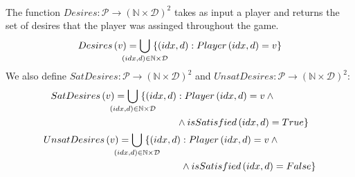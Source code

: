 \begin{definition} \ \\
  \label{desiresofplayer}
  The function $Desires : \mathcal{P} \rightarrow \left(\mathbb{N} \times
  \mathcal{D}\right)^2$ takes as input a player and returns the set of desires that the
  player was assinged throughout the game.
  \begin{equation*}
    Desires\left(v\right) = \bigcup\limits_{\mathclap{\left(idx, d\right) \in \mathbb{N}
    \times \mathcal{D}}} \; \{\left(idx, d\right) : Player\left(idx, d\right) = v\}
  \end{equation*}
  We also define $SatDesires : \mathcal{P} \rightarrow \left(\mathbb{N} \times
  \mathcal{D}\right)^2$ and $UnsatDesires : \mathcal{P} \rightarrow \left(\mathbb{N}
  \times \mathcal{D}\right)^2$:
  \begin{gather*}
    \begin{aligned}
      SatDesires\left(v\right) = \bigcup\limits_{\mathclap{\left(idx, d\right) \in
      \mathbb{N} \times \mathcal{D}}} \; \{\left(idx, d\right) &: Player\left(idx,
      d\right) = v \: \wedge \\ &\wedge isSatisfied\left(idx, d\right) = True\}
    \end{aligned} \\
    \begin{aligned}
      UnsatDesires\left(v\right) = \bigcup\limits_{\mathclap{\left(idx, d\right) \in
      \mathbb{N} \times \mathcal{D}}} \; \{\left(idx, d\right) &: Player\left(idx,
      d\right) = v \: \wedge \\ &\wedge isSatisfied\left(idx, d\right) = False\}
    \end{aligned}
  \end{gather*}
\end{definition}
